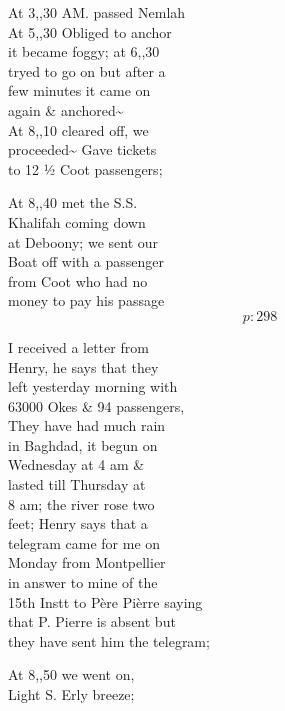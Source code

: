 \documentclass{report}
\begin{document}
	\par{
 	At 3,,30 AM. passed Nemlah\ \\At 5,,30 Obliged to anchor\ \\it became foggy; at 6,,30\ \\tryed to go on but after a\ \\few minutes it came on\ \\again \& anchored\~{}\ \\At 8,,10 cleared off, we\ \\proceeded\~{} Gave tickets\ \\to 12 ½ Coot passengers;\ \\
	}

	\par{
 	At 8,,40 met the S.S.\ \\Khalifah coming down\ \\at Deboony; we sent our\ \\Boat off with a passenger\ \\from Coot who had no\ \\money to pay his passage\ \\
  \[p: 298 \]

	}


	\par{
 	I received a letter from\ \\Henry, he says that they\ \\left yesterday morning with\ \\63000 Okes \& 94 passengers,\ \\They have had much rain\ \\in Baghdad, it begun on\ \\Wednesday at 4 am \&\ \\lasted till Thursday at\ \\8 am; the river rose two\ \\feet; Henry says that a\ \\telegram came for me on\ \\Monday from Montpellier\ \\in answer to mine of the\ \\15th Instt to Père Pièrre saying\ \\that P. Pierre is absent but\ \\they have sent him the telegram;\ \\
	}

	\par{
 	At 8,,50 we went on,\ \\Light S. Erly breeze;\ \\
	}
\end{document}
